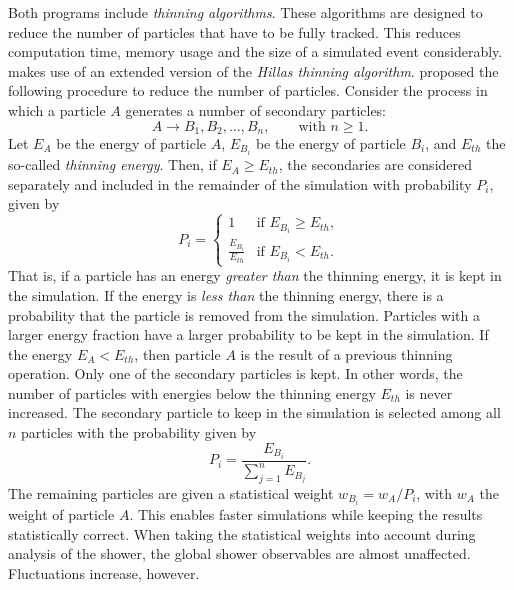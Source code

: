 Both programs include \emph{thinning algorithms}.
These algorithms are designed to reduce the number of particles that have to be
fully tracked. This reduces computation time, memory usage and the size of a
simulated event considerably. \aires makes use of an extended version of the
\emph{Hillas thinning algorithm}.  \citeauthor{Hillas:1981} \cites{Hillas:1981}{Hillas:1997}
proposed the following procedure to reduce the number of particles.  Consider
the process in which a particle $A$ generates a number of secondary particles:
\begin{equation}
A \to B_1, B_2, \ldots, B_n, \qquad \text{with } n \geq 1.
\end{equation}
Let $E_A$ be the energy of particle $A$, $E_{B_i}$ be the energy of
particle $B_i$, and $E_{th}$ the so-called \emph{thinning energy}.  Then, if
$E_A \geq E_{th}$, the secondaries are considered separately and included in the
remainder of the simulation with probability $P_i$, given by
\begin{equation}
P_i = \begin{cases}
  1 &\text{if $E_{B_i} \geq E_{th}$}, \\[5pt]
  \frac{E_{B_i}}{E_{th}} &\text{if $E_{B_i} < E_{th}$}.
\end{cases}
\end{equation}
That is, if a particle has an energy \emph{greater than} the thinning energy, it
is kept in the simulation.  If the energy is \emph{less than} the thinning
energy, there is a probability that the particle is removed from the simulation.
Particles with a larger energy fraction have a larger probability to be kept in
the simulation.  If the energy $E_A < E_{th}$, then particle $A$ is the result
of a previous thinning operation. Only one of the secondary particles is kept.
In other words, the number of particles with energies below the thinning energy
$E_{th}$ is never increased.  The secondary particle to keep in the simulation
is selected among all $n$ particles with the probability given by
\begin{equation}
P_i = \frac{E_{B_i}}{\sum_{j=1}^n E_{B_j}}.
\end{equation}
The remaining particles are given a statistical weight $w_{B_i} = w_A / P_i$,
with $w_A$ the weight of particle $A$.  This enables faster simulations while
keeping the results statistically correct.
When taking the statistical weights into account during analysis of the shower,
the global shower observables are almost unaffected.  Fluctuations increase,
however.

